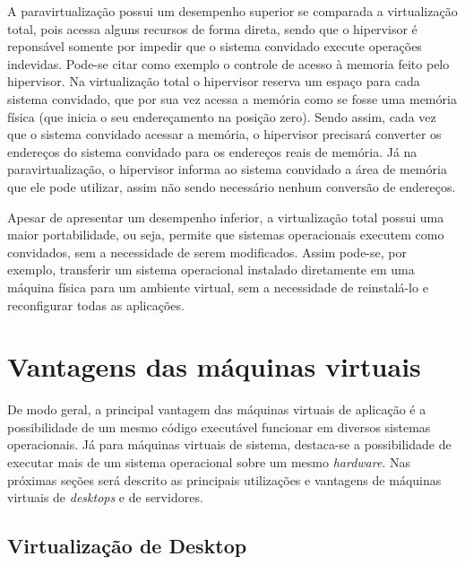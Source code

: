 A paravirtualização possui um desempenho superior se comparada a virtualização total, pois acessa alguns recursos de forma direta, sendo que 
o hipervisor é reponsável somente por impedir que o sistema convidado execute operações indevidas. Pode-se citar como exemplo o controle de
acesso à memoria feito pelo hipervisor. Na virtualização total o hipervisor reserva um espaço para cada sistema convidado, que por sua vez 
acessa a memória como se fosse uma memória física (que inicia o seu endereçamento na posição zero). Sendo assim, cada vez que o sistema convidado 
acessar a memória, o hipervisor precisará converter os endereços do sistema convidado para os endereços reais de memória. Já na paravirtualização, 
o hipervisor informa ao sistema convidado a área de memória que ele pode utilizar, assim não sendo necessário nenhum conversão de endereços.

Apesar de apresentar um desempenho inferior, a virtualização total possui uma maior portabilidade, ou seja, permite que sistemas operacionais 
executem como convidados, sem a necessidade de serem modificados. Assim pode-se, por exemplo, transferir um sistema operacional instalado 
diretamente em uma máquina física para um ambiente virtual, sem a necessidade de reinstalá-lo e reconfigurar todas as aplicações.


\section{Vantagens das máquinas virtuais}
\label{section:virtvantag}

De modo geral, a principal vantagem das máquinas virtuais de aplicação é a possibilidade de um mesmo código executável funcionar em diversos
sistemas operacionais. Já para máquinas virtuais de sistema, destaca-se a possibilidade de executar mais de um sistema operacional sobre
um mesmo \textit{hardware}. Nas próximas seções será descrito as principais utilizações e vantagens de máquinas virtuais de 
\textit{desktops} e de servidores.

\subsection{Virtualização de Desktop}
\label{section:virtdesk}

